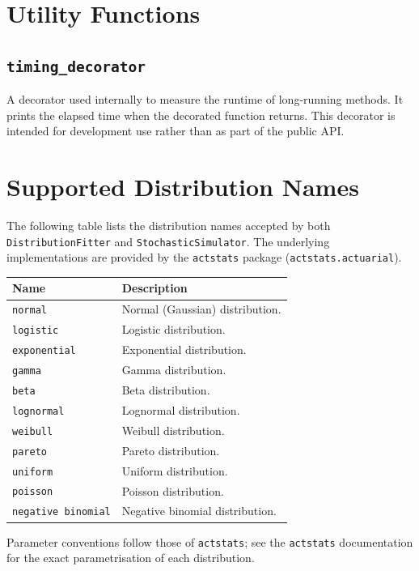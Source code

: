 \section{Utility Functions}
\label{api:utilities}

\subsection*{\texttt{timing\_decorator}}

A decorator used internally to measure the runtime of long-running
methods. It prints the elapsed time when the decorated function returns.
This decorator is intended for development use rather than as part of
the public API.

\section{Supported Distribution Names}
\label{api:dist_names}

The following table lists the distribution names accepted by both
\texttt{DistributionFitter} and \texttt{StochasticSimulator}. The
underlying implementations are provided by the \texttt{actstats}
package (\texttt{actstats.actuarial}).

\begin{longtable}{p{}p{}}
\toprule
\textbf{Name} & \textbf{Description} \\
\midrule
\endhead
\texttt{normal}            & Normal (Gaussian) distribution. \\
\texttt{logistic}          & Logistic distribution. \\
\texttt{exponential}       & Exponential distribution. \\
\texttt{gamma}             & Gamma distribution. \\
\texttt{beta}              & Beta distribution. \\
\texttt{lognormal}         & Lognormal distribution. \\
\texttt{weibull}           & Weibull distribution. \\
\texttt{pareto}            & Pareto distribution. \\
\texttt{uniform}           & Uniform distribution. \\
\texttt{poisson}           & Poisson distribution. \\
\texttt{negative binomial} & Negative binomial distribution. \\
\bottomrule
\end{longtable}

Parameter conventions follow those of \texttt{actstats}; see the
\texttt{actstats} documentation for the exact parametrisation of each
distribution.
